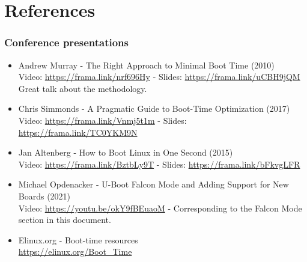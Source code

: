 \section{References}

\begin{frame}
\frametitle{Conference presentations}
\small
\begin{itemize}
\item Andrew Murray - The Right Approach to Minimal Boot Time (2010) \\
      Video: \url{https://frama.link/nrf696Hy} - Slides: \url{https://frama.link/uCBH9jQM} \\
      Great talk about the methodology.
\item Chris Simmonds - A Pragmatic Guide to Boot-Time Optimization (2017)\\
      Video: \url{https://frama.link/Vnmj5t1m} - Slides: \url{https://frama.link/TC0YKM9N}
\item Jan Altenberg - How to Boot Linux in One Second (2015)\\
      Video: \url{https://frama.link/BztbLy9T} - Slides: \url{https://frama.link/bFkvgLFR}
\item Michael Opdenacker - U-Boot Falcon Mode and Adding Support for New Boards (2021)\\
      Video: \url{https://youtu.be/okY9fBEuaoM} - Corresponding to the Falcon Mode section in this document.
\item Elinux.org - Boot-time resources\\
      \url{https://elinux.org/Boot_Time}
\end{itemize}
\end{frame}
